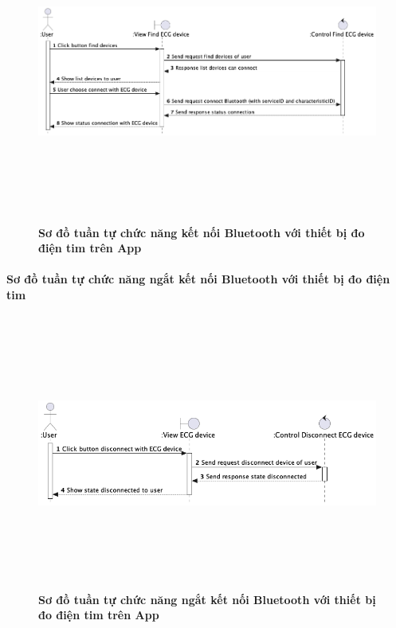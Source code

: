 \documentclass{article}%
\begin{document}
  \begin{figure}[H]
        \centering
        \includegraphics[width=16cm,height=10cm]{Images/mobile_app/connect_with_device.png}
        \caption[Sơ đồ tuần tự chức năng kết nối Bluetooth với thiết bị đo điện tim trên App]{\bfseries \fontsize{12pt}{0pt}
        \selectfont Sơ đồ tuần tự chức năng kết nối Bluetooth với thiết bị đo điện tim trên App}
        \label{hinh21} %
  \end{figure}



\paragraph{Sơ đồ tuần tự chức năng ngắt kết nối Bluetooth với thiết bị đo điện tim}
\mbox{}

  \begin{figure}[H]
        \centering
        \includegraphics[width=16cm,height=9cm]{Images/mobile_app/disconnect_with_device.png}
        \caption[Sơ đồ tuần tự chức năng ngắt kết nối Bluetooth với thiết bị đo điện tim trên App]{\bfseries \fontsize{12pt}{0pt}
        \selectfont Sơ đồ tuần tự chức năng ngắt kết nối Bluetooth với thiết bị đo điện tim trên App}
        \label{hinh21} %
  \end{figure}
\end{document}

